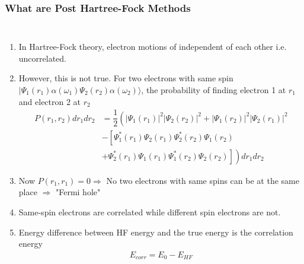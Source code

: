 \documentclass[slidestop,mathserif,compress,xcolor=svgnames]{beamer}
\begin{document}
\begin{frame}[allowframebreaks]
\frametitle{\small What are Post Hartree-Fock Methods}
\footnotesize{
\begin{columns}
\column{12cm}
\begin{enumerate}
\item In Hartree-Fock theory, electron motions of independent of each other i.e. uncorrelated.
\item However, this is not true. For two electrons with same spin $\mid\Psi_1(r_1)\alpha(\omega_1)\Psi_2(r_2)\alpha(\omega_2)\rangle$, the probability of finding electron 1 at $r_1$ and electron 2 at $r_2$
\begin{align*}
P(r_1,r_2)dr_1dr_2 &= \dfrac{1}{2}\left(|\Psi_1(r_1)|^2|\Psi_2(r_2)|^2 + |\Psi_1(r_2)|^2|\Psi_2(r_1)|^2 \right.\\ 
&- \left[\Psi^\ast_1(r_1)\Psi_2(r_1)\Psi^\ast_2(r_2)\Psi_1(r_2) \right.\\
& +\left.\left.\Psi^\ast_2(r_1)\Psi_1(r_1)\Psi^\ast_1(r_2)\Psi_2(r_2)\right]\right)dr_1dr_2
\end{align*}
\item[] Now $P(r_1,r_1)=0 \Rightarrow$ No two electrons with same spins can be at the same place $\Rightarrow$ "Fermi hole"
\item Same-spin electrons are correlated while different spin electrons are not.
\item Energy difference between HF energy and the true energy is the correlation energy
\begin{align*}
E_{corr} = E_0 - E_{HF}
\end{align*}
\end{enumerate}
\end{columns}
}
\end{frame}
\end{document}
